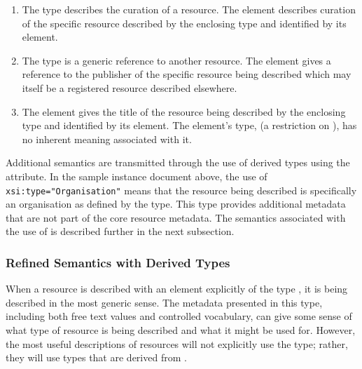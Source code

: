 \documentclass[11pt,a4paper]{ivoa}
\begin{document}
\begin{enumerate}
\item The  type describes the curation of a
       resource.  The  element
       describes curation of the specific resource described by the
       enclosing  type and identified by its
        element. 

  \item The  type is a generic reference to
       another resource.  The  element
       gives a reference to the publisher of the specific resource being
       described which may itself be a registered resource described
       elsewhere.  

  \item The  element gives the title of
       the resource being described by the enclosing
        type and identified by its
        element.  The
        element's type,
        (a restriction on
       ), has no inherent meaning associated
       with it.   
\end{enumerate}


Additional semantics are transmitted through the use of derived types
using the  attribute.  In the sample instance document
above, the use of \verb|xsi:type="Organisation"| means that the
resource being described is specifically an organisation as defined by
the  type.  This type provides additional
metadata that are not part of the core resource metadata.  The semantics
associated with the use of  is described further in the
next subsection.



\subsubsection{Refined Semantics with Derived Types}
\label{sect:derivedtypes}

When a resource is described with an element explicitly of the type
, it is being described in the most generic
sense.  The metadata presented in this type, including both free text
values and controlled vocabulary, can give some sense of what
type of resource is being described and what it might be used for.
However, the most useful descriptions of resources will not explicitly
use the  type; rather, they will use types
that are derived from .  
\end{document}
